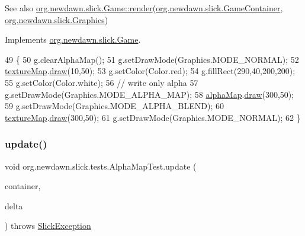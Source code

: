 \begin{DoxySeeAlso}{See also}
\mbox{\hyperlink{interfaceorg_1_1newdawn_1_1slick_1_1_game_af1a4670d43eb3ba04dfcf55ab1975b64}{org.\+newdawn.\+slick.\+Game\+::render}}(\mbox{\hyperlink{classorg_1_1newdawn_1_1slick_1_1_game_container}{org.\+newdawn.\+slick.\+Game\+Container}}, \mbox{\hyperlink{classorg_1_1newdawn_1_1slick_1_1_graphics}{org.\+newdawn.\+slick.\+Graphics}}) 
\end{DoxySeeAlso}


Implements \mbox{\hyperlink{interfaceorg_1_1newdawn_1_1slick_1_1_game_af1a4670d43eb3ba04dfcf55ab1975b64}{org.\+newdawn.\+slick.\+Game}}.


\begin{DoxyCode}
49                                   \{
50         g.clearAlphaMap();
51         g.setDrawMode(Graphics.MODE\_NORMAL);
52         \mbox{\hyperlink{classorg_1_1newdawn_1_1slick_1_1tests_1_1_alpha_map_test_a1ba492928b78eceb9442f13fb61a45f3}{textureMap}}.\mbox{\hyperlink{classorg_1_1newdawn_1_1slick_1_1_image_a9bddcca05c7140ab45df8ac5b250b6cd}{draw}}(10,50);
53         g.setColor(Color.red);
54         g.fillRect(290,40,200,200);
55         g.setColor(Color.white);
56         \textcolor{comment}{// write only alpha}
57         g.setDrawMode(Graphics.MODE\_ALPHA\_MAP);
58         \mbox{\hyperlink{classorg_1_1newdawn_1_1slick_1_1tests_1_1_alpha_map_test_a1feaeb3164bd0e648d4f9cf7a63ce24a}{alphaMap}}.\mbox{\hyperlink{classorg_1_1newdawn_1_1slick_1_1_image_a9bddcca05c7140ab45df8ac5b250b6cd}{draw}}(300,50);
59         g.setDrawMode(Graphics.MODE\_ALPHA\_BLEND);
60         \mbox{\hyperlink{classorg_1_1newdawn_1_1slick_1_1tests_1_1_alpha_map_test_a1ba492928b78eceb9442f13fb61a45f3}{textureMap}}.\mbox{\hyperlink{classorg_1_1newdawn_1_1slick_1_1_image_a9bddcca05c7140ab45df8ac5b250b6cd}{draw}}(300,50);
61         g.setDrawMode(Graphics.MODE\_NORMAL);
62     \}
\end{DoxyCode}
\mbox{\label{classorg_1_1newdawn_1_1slick_1_1tests_1_1_alpha_map_test_a42988459f515e69d91b96917c218b6e1}} 
\subsubsection{\texorpdfstring{update()}{update()}}
{\footnotesize\ttfamily void org.\+newdawn.\+slick.\+tests.\+Alpha\+Map\+Test.\+update (\begin{DoxyParamCaption}\item[{\mbox{\hyperlink{classorg_1_1newdawn_1_1slick_1_1_game_container}{Game\+Container}}}]{container,  }\item[{int}]{delta }\end{DoxyParamCaption}) throws \mbox{\hyperlink{classorg_1_1newdawn_1_1slick_1_1_slick_exception}{Slick\+Exception}}\hspace{0.3cm}{\ttfamily [inline]}}

